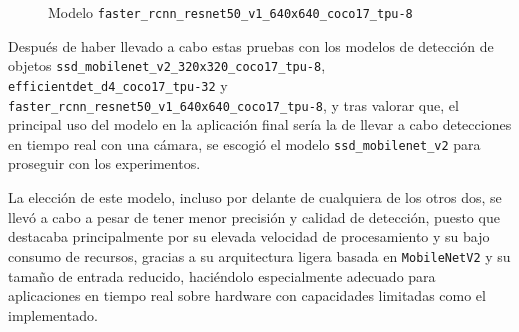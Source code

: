   	\begin{figure}[H]
    		\begin{center}
      		\subcapcentertrue
      		\hspace{2mm}
    	\end{center}
    	\caption{Modelo \texttt{faster\_rcnn\_resnet50\_v1\_640x640\_coco17\_tpu-8 }}
    	\label{fig:modelo_faster_rcnn_resnet50}
  	\end{figure}	

Después de haber llevado a cabo estas pruebas con los modelos de detección de objetos \verb|ssd_mobilenet_v2_320x320_coco17_tpu-8|, \verb|efficientdet_d4_coco17_tpu-32| y \verb|faster_rcnn_resnet50_v1_640x640_coco17_tpu-8|, y tras valorar que, el principal uso del modelo en la aplicación final sería la de llevar a cabo detecciones en tiempo real con una cámara, se escogió el modelo \verb|ssd_mobilenet_v2| para proseguir con los experimentos. 

La elección de este modelo, incluso por delante de cualquiera de los otros dos, se llevó a cabo a pesar de tener menor precisión y calidad de detección, puesto que destacaba principalmente por su elevada velocidad de procesamiento y su bajo consumo de recursos, gracias a su arquitectura ligera basada en \verb|MobileNetV2| y su tamaño de entrada reducido, haciéndolo especialmente adecuado para aplicaciones en tiempo real sobre hardware con capacidades limitadas como el implementado.


